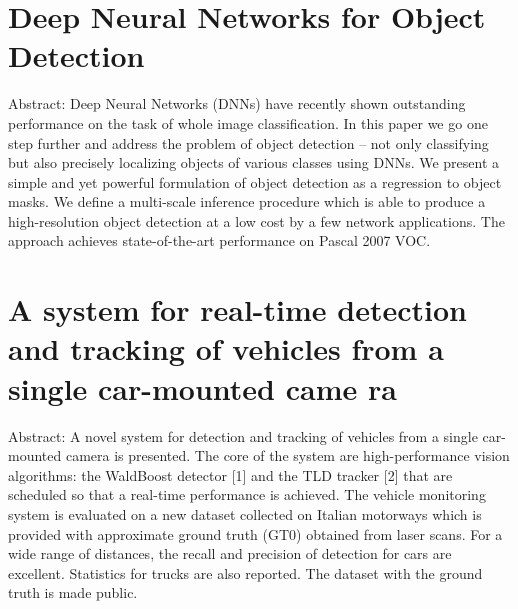 \documentclass[letterpaper, 10 pt, conference]{ieeeconf}  %
\begin{document}
\section{Deep Neural Networks for Object Detection}

Abstract:
    Deep Neural Networks (DNNs) have recently shown outstanding performance on the task of whole image classification. In this paper we go one step further and address the problem of object detection -- not only classifying but also precisely localizing objects of various classes using DNNs. We present a simple and yet powerful formulation of object detection as a regression to object masks. We define a multi-scale inference procedure which is able to produce a high-resolution object detection at a low cost by a few network applications. The approach achieves state-of-the-art performance on Pascal 2007 VOC.\cite{NIPS2013_5207}

\section{A system for real-time detection and tracking of vehicles from a single car-mounted came     ra}

Abstract:
    A novel system for detection and tracking of vehicles from a single car-mounted camera is presented. The core of the system are high-performance vision algorithms: the WaldBoost detector [1] and the TLD tracker [2] that are scheduled so that a real-time performance is achieved. The vehicle monitoring system is evaluated on a new dataset collected on Italian motorways which is provided with approximate ground truth (GT0) obtained from laser scans. For a wide range of distances, the recall and precision of detection for cars are excellent. Statistics for trucks are also reported. The dataset with the ground truth is made public.\cite{6338748}



\addtolength{\textheight}{-12cm}   %







\end{document}
